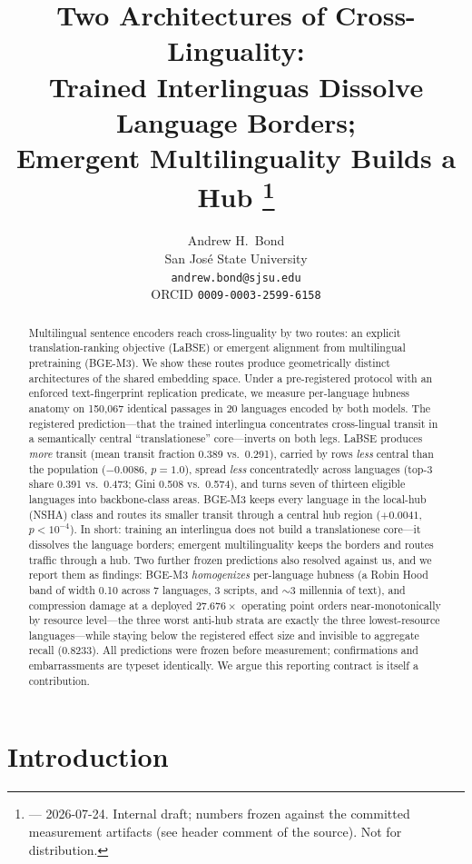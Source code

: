 \documentclass[11pt]{article}
\title{Two Architectures of Cross-Linguality:\\
  Trained Interlinguas Dissolve Language Borders;\\
  Emergent Multilinguality Builds a Hub
  \thanks{\draftmark{} --- 2026-07-24. Internal draft; numbers frozen
  against the committed measurement artifacts (see header comment of the
  source). Not for distribution.}}
\author{Andrew H.\ Bond \\
  San Jos\'e State University \\
  \texttt{andrew.bond@sjsu.edu} \\
  ORCID \texttt{0009-0003-2599-6158}}
\begin{document}
\maketitle

\begin{abstract}
Multilingual sentence encoders reach cross-linguality by two routes: an
explicit translation-ranking objective (LaBSE) or emergent alignment from
multilingual pretraining (BGE-M3). We show these routes produce
geometrically distinct architectures of the shared embedding space. Under a
pre-registered protocol with an enforced text-fingerprint replication
predicate, we measure per-language hubness anatomy on 150{,}067 identical
passages in 20 languages encoded by both models. The registered
prediction---that the trained interlingua concentrates cross-lingual
transit in a semantically central ``translationese'' core---inverts on both
legs. LaBSE produces \emph{more} transit (mean transit fraction 0.389 vs.\
0.291), carried by rows \emph{less} central than the population
($-0.0086$, $p=1.0$), spread \emph{less} concentratedly across languages
(top-3 share 0.391 vs.\ 0.473; Gini 0.508 vs.\ 0.574), and turns seven of
thirteen eligible languages into backbone-class areas. BGE-M3 keeps every
language in the local-hub (NSHA) class and routes its smaller transit
through a central hub region ($+0.0041$, $p<10^{-4}$). In short: training
an interlingua does not build a translationese core---it dissolves the
language borders; emergent multilinguality keeps the borders and routes
traffic through a hub. Two further frozen predictions also resolved
against us, and we report them as findings: BGE-M3 \emph{homogenizes}
per-language hubness (a Robin Hood band of width 0.10 across 7 languages,
3 scripts, and $\sim$3 millennia of text), and compression damage at a
deployed $27.676\times$ operating point orders near-monotonically by
resource level---the three worst anti-hub strata are exactly the three
lowest-resource languages---while staying below the registered effect size
and invisible to aggregate recall (0.8233). All predictions were frozen
before measurement; confirmations and embarrassments are typeset
identically. We argue this reporting contract is itself a contribution.
\end{abstract}

\section{Introduction}
\label{sec:intro}
\end{document}
